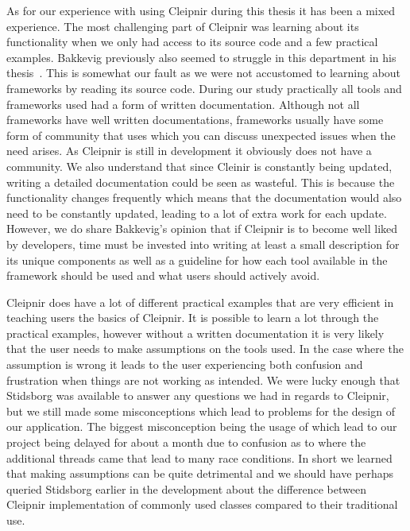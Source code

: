 As for our experience with using Cleipnir during this thesis it has been a mixed experience. The most challenging part of Cleipnir was learning about its functionality when we only had access to its source code and a few practical examples. Bakkevig previously also seemed to struggle in this department in his thesis~\cite[p.~43-44]{PAPER:EivindPaper}. This is somewhat our fault as we were not accustomed to learning about frameworks by reading its source code. During our study practically all tools and frameworks used had a form of written documentation. Although not all frameworks have well written documentations, frameworks usually have some form of community that uses which you can discuss unexpected issues when the need arises. As Cleipnir is still in development it obviously does not have a community. We also understand that since Cleinir is constantly being updated, writing a detailed documentation could be seen as wasteful. This is because the functionality changes frequently which means that the documentation would also need to be constantly updated, leading to a lot of extra work for each update. However, we do share Bakkevig's opinion that if  Cleipnir is to become well liked by developers, time must be invested into writing at least a small description for its unique components as well as a guideline for how each tool available in the framework should be used and what users should actively avoid. 

Cleipnir does have a lot of different practical examples that are very efficient in teaching users the basics of Cleipnir. It is possible to learn a lot through the practical examples, however without a written documentation it is very likely that the user needs to make assumptions on the tools used. In the case where the assumption is wrong it leads to the user experiencing both confusion and frustration when things are not working as intended. We were lucky enough that Stidsborg was available to answer any questions we had in regards to Cleipnir, but we still made some misconceptions which lead to problems for the design of our application. The biggest misconception being the usage of  which lead to our project being delayed for about a month due to confusion as to where the additional threads came that lead to many race conditions.   In short we learned that making assumptions can be quite detrimental and we should have perhaps queried Stidsborg earlier in the development about the difference between Cleipnir implementation of commonly used classes compared to their traditional use. 
\fi

